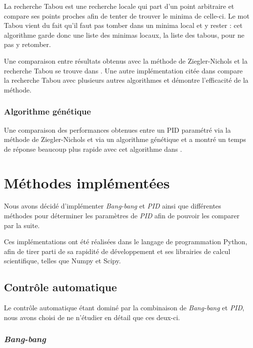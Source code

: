 \documentclass[a4paper,10pt]{report}
\begin{document}
La recherche Tabou est une recherche locale qui part d'un point arbitraire et compare ses points proches afin de tenter de trouver le minima de celle-ci.
Le mot Tabou vient du fait qu'il faut pas tomber dans un minima local et y rester :
cet algorithme garde donc une liste des minimas locaux, la liste des tabous, pour ne pas y retomber.

Une comparaison entre résultats obtenus avec la méthode de Ziegler-Nichols et la recherche Tabou se trouve dans \cite{Karaboga569754}.
Une autre implémentation citée dans \cite{bagis2011tabu} compare la recherche Tabou avec plusieurs autres algorithmes et démontre l'efficacité de la méthode.

\subsection{Algorithme génétique}


Une comparaison des performances obtenues entre un PID paramétré via la méthode de Ziegler-Nichols et via un algorithme génétique et a montré un temps de réponse beaucoup plus rapide avec cet algorithme dans \cite{thomas2009position}.

\chapter{Méthodes implémentées}
\label{chap:impl}

Nous avons décidé d'implémenter \textit{Bang-bang} et \textit{PID} ainsi que différentes méthodes pour déterminer les paramètres de \textit{PID} afin de pouvoir les comparer par la suite.

Ces implémentations ont été réalisées dans le langage de programmation Python, afin de tirer parti de sa rapidité de développement et ses librairies de calcul scientifique, telles que Numpy et Scipy.

\section{Contrôle automatique}
\label{sec:contr-implem}
Le contrôle automatique étant dominé par la combinaison de \textit{Bang-bang} et \textit{PID}, nous avons choisi de ne n'étudier en détail que ces deux-ci.

\subsection{\emph{Bang-bang}}
\end{document}

